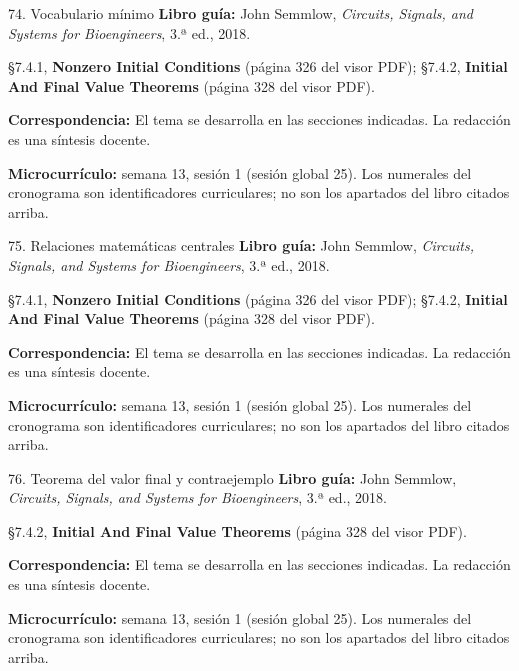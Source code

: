 \documentclass[
  10pt,
  ignorenonframetext,
  aspectratio=169,
  spanish,
]{beamer}
\begin{document}
\begin{frame}{74. Vocabulario mínimo}
\label{vocabulario-muxednimo-4}
\textbf{Libro guía:} John Semmlow, \emph{Circuits, Signals, and Systems
for Bioengineers}, 3.ª ed., 2018.

§7.4.1, \textbf{Nonzero Initial Conditions} (página 326 del visor PDF);
§7.4.2, \textbf{Initial And Final Value Theorems} (página 328 del visor
PDF).

\textbf{Correspondencia:} El tema se desarrolla en las secciones
indicadas. La redacción es una síntesis docente.

\textbf{Microcurrículo:} semana 13, sesión 1 (sesión global 25). Los
numerales del cronograma son identificadores curriculares; no son los
apartados del libro citados arriba.
\end{frame}

\begin{frame}{75. Relaciones matemáticas centrales}
\label{relaciones-matemuxe1ticas-centrales-4}
\textbf{Libro guía:} John Semmlow, \emph{Circuits, Signals, and Systems
for Bioengineers}, 3.ª ed., 2018.

§7.4.1, \textbf{Nonzero Initial Conditions} (página 326 del visor PDF);
§7.4.2, \textbf{Initial And Final Value Theorems} (página 328 del visor
PDF).

\textbf{Correspondencia:} El tema se desarrolla en las secciones
indicadas. La redacción es una síntesis docente.

\textbf{Microcurrículo:} semana 13, sesión 1 (sesión global 25). Los
numerales del cronograma son identificadores curriculares; no son los
apartados del libro citados arriba.
\end{frame}

\begin{frame}{76. Teorema del valor final y contraejemplo}
\label{teorema-del-valor-final-y-contraejemplo}
\textbf{Libro guía:} John Semmlow, \emph{Circuits, Signals, and Systems
for Bioengineers}, 3.ª ed., 2018.

§7.4.2, \textbf{Initial And Final Value Theorems} (página 328 del visor
PDF).

\textbf{Correspondencia:} El tema se desarrolla en las secciones
indicadas. La redacción es una síntesis docente.

\textbf{Microcurrículo:} semana 13, sesión 1 (sesión global 25). Los
numerales del cronograma son identificadores curriculares; no son los
apartados del libro citados arriba.
\end{frame}
\end{document}
